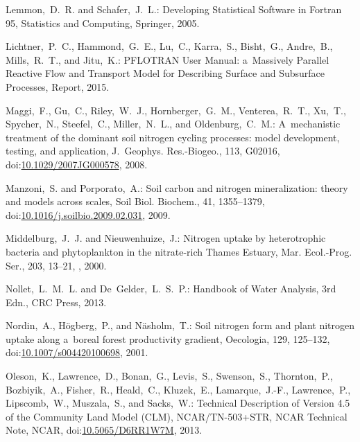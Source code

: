 \documentclass[gmdd, online, hvmath]{copernicus}
\begin{document}
\begin{thebibliography}{55}
Lemmon,~D.~R. and Schafer,~J.~L.:
Developing Statistical Software in Fortran 95, Statistics and Computing,
Springer,   2005.


Lichtner,~P.~C., Hammond,~G.~E., Lu,~C., Karra,~S., Bisht,~G., Andre,~B., Mills,~R.~T., and Jitu,~K.:
PFLOTRAN User Manual: a~Massively Parallel Reactive Flow and Transport Model for Describing Surface and Subsurface Processes, Report,
  2015.


Maggi,~F., Gu,~C., Riley,~W.~J., Hornberger,~G.~M., Venterea,~R.~T., Xu,~T., Spycher,~N., Steefel,~C., Miller,~N.~L., and Oldenburg,~C.~M.:
A~mechanistic treatment of the dominant soil nitrogen cycling processes: model development, testing, and application,
J.~Geophys. Res.-Biogeo.,
113, G02016,
doi:\href{http://dx.doi.org/10.1029/2007JG000578}{10.1029/2007JG000578}, 2008.


Manzoni,~S. and Porporato,~A.:
Soil carbon and nitrogen mineralization: theory and models across scales,
Soil Biol. Biochem.,
41, 1355--1379,
doi:\href{http://dx.doi.org/10.1016/j.soilbio.2009.02.031}{10.1016/j.soilbio.2009.02.031}, 2009.


Middelburg,~J.~J. and Nieuwenhuize,~J.:
Nitrogen uptake by heterotrophic bacteria and phytoplankton in the nitrate-rich Thames Estuary,
Mar. Ecol.-Prog. Ser.,
203, 13--21,
,
  2000.


Nollet,~L.~M.~L. and De~Gelder,~L.~S.~P.:
Handbook of Water Analysis, 3rd Edn.,
CRC Press,   2013.


Nordin,~A., H\"{o}gberg,~P., and N\"{a}sholm,~T.:
Soil nitrogen form and plant nitrogen uptake along a~boreal forest productivity gradient,
Oecologia,
129, 125--132,
doi:\href{http://dx.doi.org/10.1007/s004420100698}{10.1007/s004420100698}, 2001.


Oleson,~K., Lawrence,~D., Bonan,~G., Levis,~S., Swenson,~S., Thornton,~P., Bozbiyik,~A., Fisher,~R., Heald,~C., Kluzek,~E., Lamarque,~J.-F., Lawrence,~P., Lipscomb,~W., Muszala,~S., and Sacks,~W.:
Technical Description of Version 4.5 of the Community Land Model (CLM),
NCAR/TN-503+STR, NCAR Technical Note,
NCAR,
doi:\href{http://dx.doi.org/10.5065/D6RR1W7M}{10.5065/D6RR1W7M}, 2013.



\end{thebibliography}
\end{document}
